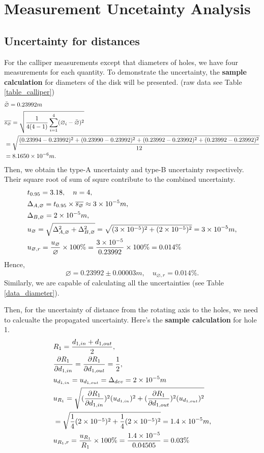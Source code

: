 \section{Measurement Uncetainty Analysis}
\subsection{Uncertainty for distances}
    For the calliper measurements except that diameters of holes, we have four measurements for each quantity. To demonstrate the uncertainty, the \textbf{sample calculation} for diameters of the disk will be presented. (raw data see Table \ref{table_calliper})
    \[
    \begin{split}
        &\bar{\varnothing}=0.23992m\\
        &\overline{s_{\varnothing}}=\sqrt{\frac{1}{4(4-1)}\sum_{i=1}^4(\varnothing_i-\bar{\varnothing})^2}\\
        &=\sqrt{\frac{( 0.23994-0.23992)^2+(0.23990-0.23992)^2+(0.23992-0.23992)^2+(0.23992-0.23992)^2}{12}}\\
        &=8.1650\times10^{-6}m.\\
    \end{split}
    \]
    Then, we obtain the type-A uncertainty and type-B uncertainty respectively. Their square root of sum of squre contribute to the combined uncertainty.
    \[
    \begin{split}
        &t_{0.95}=3.18,\quad n=4,\\
        &\Delta_{A,\varnothing}=t_{0.95}\times\overline{s_{\varnothing}}\approx3\times10^{-5}m,\\
        &\Delta_{B,\varnothing}=2\times10^{-5}m,\\
        &u_{\varnothing}=\sqrt{\Delta_{A,\varnothing}^2+\Delta_{B,\varnothing}^2}=\sqrt{(3\times10^{-5})^2+(2\times10^{-5})^2}=3\times10^{-5}m,\\
        &u_{\varnothing,r}=\frac{u_{\varnothing}}{\varnothing}\times100\%=\frac{3\times10^{-5}}{0.23992}\times100\%=0.014\%
    \end{split}
    \]
    Hence, 
    \[
        \varnothing=0.23992\pm0.00003m,\quad u_{\varnothing,r}=0.014\%.
    \]
    Similarly, we are capable of calculating all the uncertainties (see Table \ref{data_diameter}).

    Then, for the uncertainty of distance from the rotating axis to the holes, we need to calcualte the propagated uncertainty. Here's the \textbf{sample calculation} for hole 1.
    \[
    \begin{split}
        &R_1=\frac{d_{1,in}+d_{1,out}}{2},\\
        &\frac{\partial R_1}{\partial d_{1,in}}=\frac{\partial R_1}{\partial d_{1,out}}=\frac{1}{2},\\
        &u_{d_{1,in}}=u_{d_{1,out}}=\Delta_{dev}=2\times10^{-5}m\\
        &u_{R_1}=\sqrt{(\frac{\partial R_1}{\partial d_{1,in}})^2(u_{d_{1,in}})^2+(\frac{\partial R_1}{\partial d_{1,out}})^2(u_{d_{1,out}})^2}\\
        &=\sqrt{\frac{1}{4}(2\times10^{-5})^2+\frac{1}{4}(2\times10^{-5})^2}=1.4\times10^{-5}m,\\
        &u_{R_1,r}=\frac{u_{R_1}}{R_1}\times100\%=\frac{1.4\times10^{-5}}{0.04505}=0.03\%
    \end{split}
    \]

